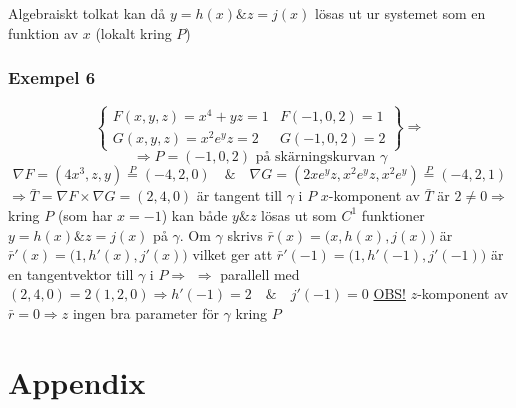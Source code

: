 \documentclass{article}
\begin{document}
Algebraiskt tolkat kan då \(y = h(x) \& z = j(x)\) lösas ut ur systemet som en funktion av \(x\) (lokalt kring \(P\))

\subsubsection{Exempel 6} 
\begin{equation}\label{eq:6.8}
	\begin{Bmatrix}
		F(x,y,z) = x^4 + yz = 1 & F(-1,0,2) = 1 \\
		G(x,y,z) = x^2e^yz = 2 & G(-1,0,2) = 2
	\end{Bmatrix} \Rightarrow
\end{equation}
\[\Rightarrow P = (-1,0,2) \text{ på skärningskurvan } \gamma\]
\[\nabla F = (4x^3,z,y) \overset{P}{=} (-4,2,0) \quad\&\quad \nabla G = (2xe^yz,x^2e^yz,x^2e^y) \overset{P}{=} (-4,2,1)\]
\(\Rightarrow \bar{T} = \nabla F \times \nabla G = (2,4,0)\) är tangent till \(\gamma\) i \(P\) \newline
\(x\)-komponent av \(\bar{T}\) är \(2 \neq 0 \Rightarrow\) kring \(P\) (som har \(x = -1\)) kan både \(y \& z\) lösas ut som \(C^1\) funktioner \(y = h(x) \& z = j(x)\) på \(\gamma\). \newline
Om \(\gamma\) skrivs \(\bar{r}(x) = \Big(x,h(x),j(x)\Big)\) är \(\bar{r}'(x) = \Big(1,h'(x),j'(x)\Big)\) vilket ger att \(\bar{r}'(-1) = \Big(1,h'(-1),j'(-1)\Big)\) är en tangentvektor till \(\gamma\) i \(P \Rightarrow\) \newline
\(\Rightarrow\) parallell med \((2,4,0) = 2(1,2,0) \Rightarrow h'(-1) = 2 \quad\&\quad j'(-1) = 0\) \newline
\underline{OBS!} \(z\)-komponent av \(\bar{r} = 0 \Rightarrow z\) ingen bra parameter för \(\gamma\) kring \(P\)



\newpage
\fancyhf{}
\section{Appendix}
\begin{appendix}
	\listoffigures
	\listoftables
\end{appendix}
\end{document}
